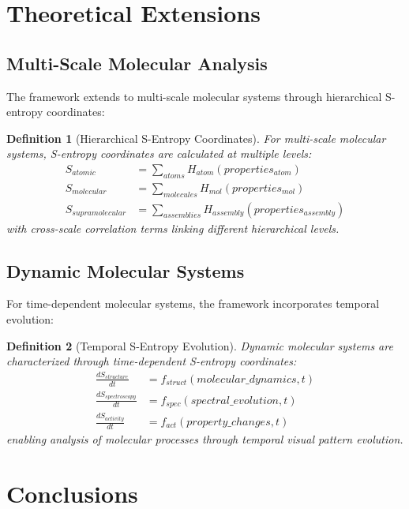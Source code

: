 \documentclass[12pt,a4paper]{article}
\newtheorem{definition}{Definition}
\begin{document}
\section{Theoretical Extensions}

\subsection{Multi-Scale Molecular Analysis}

The framework extends to multi-scale molecular systems through hierarchical S-entropy coordinates:

\begin{definition}[Hierarchical S-Entropy Coordinates]
For multi-scale molecular systems, S-entropy coordinates are calculated at multiple levels:
\begin{align}
S_{atomic} &= \sum_{atoms} H_{atom}(properties_{atom}) \\
S_{molecular} &= \sum_{molecules} H_{mol}(properties_{mol}) \\
S_{supramolecular} &= \sum_{assemblies} H_{assembly}(properties_{assembly})
\end{align}
with cross-scale correlation terms linking different hierarchical levels.
\end{definition}

\subsection{Dynamic Molecular Systems}

For time-dependent molecular systems, the framework incorporates temporal evolution:

\begin{definition}[Temporal S-Entropy Evolution]
Dynamic molecular systems are characterized through time-dependent S-entropy coordinates:
\begin{align}
\frac{dS_{structure}}{dt} &= f_{struct}(molecular\_dynamics, t) \\
\frac{dS_{spectroscopy}}{dt} &= f_{spec}(spectral\_evolution, t) \\
\frac{dS_{activity}}{dt} &= f_{act}(property\_changes, t)
\end{align}
enabling analysis of molecular processes through temporal visual pattern evolution.
\end{definition}

\section{Conclusions}
\end{document}
